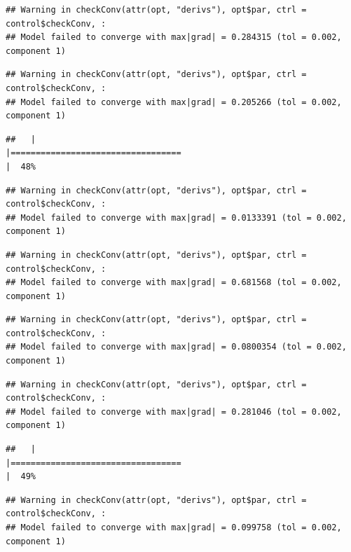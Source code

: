 \documentclass[
  12pt,
]{book}
\begin{document}
\begin{verbatim}
## Warning in checkConv(attr(opt, "derivs"), opt$par, ctrl = control$checkConv, :
## Model failed to converge with max|grad| = 0.284315 (tol = 0.002, component 1)
\end{verbatim}

\begin{verbatim}
## Warning in checkConv(attr(opt, "derivs"), opt$par, ctrl = control$checkConv, :
## Model failed to converge with max|grad| = 0.205266 (tol = 0.002, component 1)
\end{verbatim}

\begin{verbatim}
##   |                                                                              |==================================                                    |  48%
\end{verbatim}

\begin{verbatim}
## Warning in checkConv(attr(opt, "derivs"), opt$par, ctrl = control$checkConv, :
## Model failed to converge with max|grad| = 0.0133391 (tol = 0.002, component 1)
\end{verbatim}

\begin{verbatim}
## Warning in checkConv(attr(opt, "derivs"), opt$par, ctrl = control$checkConv, :
## Model failed to converge with max|grad| = 0.681568 (tol = 0.002, component 1)
\end{verbatim}

\begin{verbatim}
## Warning in checkConv(attr(opt, "derivs"), opt$par, ctrl = control$checkConv, :
## Model failed to converge with max|grad| = 0.0800354 (tol = 0.002, component 1)
\end{verbatim}

\begin{verbatim}
## Warning in checkConv(attr(opt, "derivs"), opt$par, ctrl = control$checkConv, :
## Model failed to converge with max|grad| = 0.281046 (tol = 0.002, component 1)
\end{verbatim}

\begin{verbatim}
##   |                                                                              |==================================                                    |  49%
\end{verbatim}

\begin{verbatim}
## Warning in checkConv(attr(opt, "derivs"), opt$par, ctrl = control$checkConv, :
## Model failed to converge with max|grad| = 0.099758 (tol = 0.002, component 1)
\end{verbatim}
\end{document}
